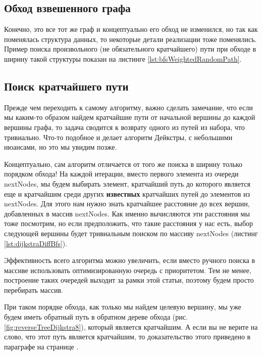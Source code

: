 \documentclass[../../article.tex]{subfiles}
\begin{document}
\subsection{Обход взвешенного графа}

Конечно, это все тот же граф и концептуально его обход не изменился, но так как поменялась структура данных, то некоторые детали реализации тоже поменялись. Пример поиска произвольного (не обязательного кратчайшего) пути при обходе в ширину такой структуры показан на листинге \ref{lst:bfsWeightedRandomPath}.

\subsection{Поиск кратчайшего пути}

Прежде чем переходить к самому алгоритму, важно сделать замечание, что если мы каким-то образом найдем кратчайшие пути от начальной вершины до каждой вершины графа, то задача сводится к возврату одного из путей из набора, что тривиально. Что-то подобное и делает алгоритм Дейкстры, с небольшими нюансами, но это мы увидим позже.

Концептуально, сам алгоритм отличается от того же поиска в ширину только порядком обхода! На каждой итерации, вместо первого элемента из очереди {\firacodebold nextNodes}, мы будем выбирать элемент, кратчайший путь до которого является еще и кратчайшим среди других {\bfseries известных} кратчайших путей до элементов из {\firacodebold nextNodes}. Для этого нам нужно знать кратчайшее расстояние до всех вершин, добавленных в массив {\firacodebold nextNodes}. Как именно вычисляются эти расстояния мы тоже посмотрим, но если предположить, что такие расстояния у нас есть, выбор следующей вершины будет тривиальным поиском по массиву {\firacodebold nextNodes} (листинг \ref{lst:dijkstraDiffBfs}).

Эффективность всего алгоритма можно увеличить, если вместо ручного поиска в массиве использовать оптимизированную очередь с приоритетом. Тем не менее, построение таких очередей выходит за рамки этой статьи, поэтому будем просто перебирать массив.

При таком порядке обхода, как только мы найдем целевую вершину, мы уже будем иметь обратный путь {\firacodebold [h, g, f, a]} в обратном дереве обхода (рис. \ref{fig:reverseTreeDijkstra8}), который является кратчайшим. А если вы не верите на слово, что этот путь является кратчайшим, то доказательство этого приведено в параграфе на странице \pageref{dijkstraProve}.
\end{document}
